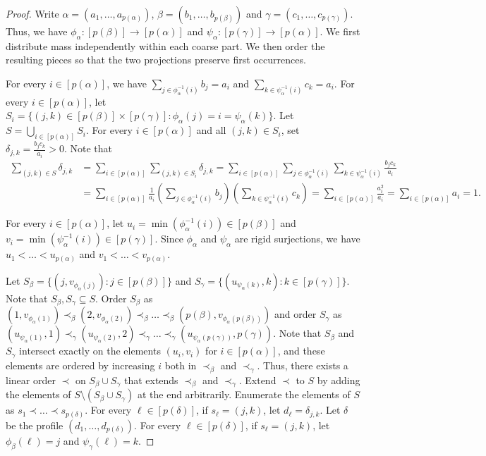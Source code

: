 \documentclass[11pt]{article}
\theoremstyle{remark}
\begin{document}
\begin{proof}
Write $\alpha = (a_1, \ldots, a_{p(\alpha)})$, $\beta = (b_1, \ldots, b_{p(\beta)})$ and $\gamma = (c_1, \ldots, c_{p(\gamma)})$.
Thus, we have $\phi_{\alpha} : [p(\beta)] \to [p(\alpha)]$ and $\psi_{\alpha} : [p(\gamma)] \to [p(\alpha)]$.
We first distribute mass independently within each coarse part. 
We then order the resulting pieces so that the two projections preserve first occurrences.

For every $i \in [p(\alpha)]$, we have $\sum_{j \in \phi_{\alpha}^{-1}(i)}b_j=a_i$ and $\sum_{k\in \psi_{\alpha}^{-1}(i)}c_k=a_i$.
For every $i \in [p(\alpha)]$, let $S_i = \{(j, k) \in [p(\beta)] \times [p(\gamma)] : \phi_{\alpha}(j) = i = \psi_{\alpha}(k)\}$. Let $S = \bigcup_{i \in [p(\alpha)]} S_i$.
For every $i \in [p(\alpha)]$ and all $(j, k) \in S_i$, set
$\delta_{j,k}=\frac{b_j c_k}{a_i} > 0$.
Note that \begin{align*}
    \sum_{(j, k) \in S}\delta_{j,k} &= \sum_{i \in [p(\alpha)]}\sum_{(j, k) \in S_i}\delta_{j,k} = \sum_{i \in [p(\alpha)]} \sum_{j \in \phi_{\alpha}^{-1}(i)}\sum_{k \in \psi_{\alpha}^{-1}(i)}\frac{b_j c_k}{a_i} \\
    &= \sum_{i \in [p(\alpha)]} \frac{1}{a_i}\left(\sum_{j \in \phi_{\alpha}^{-1}(i)}b_j\right)\left(\sum_{k \in \psi_{\alpha}^{-1}(i)} c_k\right) = \sum_{i \in [p(\alpha)]}\frac{a_i^2}{a_i} =  \sum_{i \in [p(\alpha)]}a_i = 1.
\end{align*}

For every $i \in [p(\alpha)]$, let $u_i = \min(\phi_{\alpha}^{-1}(i)) \in [p(\beta)]$ and $v_i = \min(\psi_{\alpha}^{-1}(i)) \in [p(\gamma)]$.
Since $\phi_{\alpha}$ and $\psi_{\alpha}$ are rigid surjections, we have $u_1 < \ldots < u_{p(\alpha)}$ and $v_1 < \ldots < v_{p(\alpha)}$.

Let $S_{\beta} = \{(j, v_{\phi_{\alpha}(j)}) : j \in [p(\beta)]\}$ and $S_{\gamma} = \{(u_{\psi_{\alpha}(k)}, k) : k \in [p(\gamma)]\}$.
Note that $S_{\beta}, S_{\gamma} \subseteq S$.
Order $S_{\beta}$ as $(1, v_{\phi_{\alpha}(1)}) \prec_{\beta} (2, v_{\phi_{\alpha}(2)}) \prec_{\beta} \ldots \prec_{\beta} (p(\beta), v_{\phi_{\alpha}(p(\beta))})$ and order $S_{\gamma}$ as $( u_{\psi_{\alpha}(1)}, 1) \prec_{\gamma} (u_{\psi_{\alpha}(2)}, 2) \prec_{\gamma} \ldots \prec_{\gamma} (u_{\psi_{\alpha}(p(\gamma))}, p(\gamma))$.
Note that $S_{\beta}$ and $S_{\gamma}$ intersect exactly on the elements $(u_i, v_i)$ for $i \in [p(\alpha)]$, and these elements are ordered by increasing $i$ both in $\prec_{\beta}$ and $\prec_{\gamma}$.
Thus, there exists a linear order $\prec$ on $S_{\beta} \cup S_{\gamma}$ that extends $\prec_{\beta}$ and $\prec_{\gamma}$.
Extend $\prec$ to $S$ by adding the elements of $S \setminus (S_{\beta} \cup S_{\gamma})$ at the end arbitrarily.
Enumerate the elements of $S$ as $s_1 \prec \ldots \prec s_{p(\delta)}$.
For every $\ell \in [p(\delta)]$, if $s_\ell = (j, k)$, let $d_\ell = \delta_{j, k}$.
Let $\delta$ be the profile $(d_1, \ldots, d_{p(\delta)})$.
For every $\ell \in [p(\delta)]$, if $s_\ell = (j, k)$, let $\phi_{\beta}(\ell) = j$ and $\psi_{\gamma}(\ell) = k$.


\end{proof}
\end{document}
